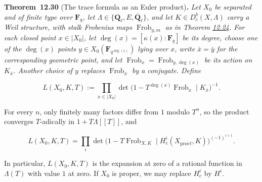 \documentclass[11pt]{article}
\newenvironment{bpstatement}[2]{\par\addvspace{0.6\baselineskip}\noindent\textbf{#1}#2\textbf{.}\enspace\ignorespaces}
  {\par\addvspace{0.4\baselineskip}}
\newenvironment{bpstatementit}[2]{\begin{bpstatement}{#1}{#2}\itshape\ignorespaces}{\end{bpstatement}}
\providecommand{\Dbc}{}\renewcommand{\Dbc}{D^b_c}
\begin{document}
\label{bp92}%
\begin{bpstatementit}{Theorem~12.30}{ (The trace formula as an Euler product)}
Let \(X_0\) be separated and of finite type over \(\mathbf F_q\), let \(\Lambda\in\{\mathbf Q_\ell,E,\overline{\mathbf Q}_\ell\}\), and let \(K\in\Dbc(X,\Lambda)\) carry a Weil structure, with stalk Frobenius maps \(\operatorname{Frob}_{y,m}\) as in Theorem \hyperref[bp73]{12.24}. For each closed point \(x\in|X_0|\), let \(\deg(x)=[\kappa(x):\mathbf F_q]\) be its degree, choose one of the \(\deg(x)\) points \(y\in X_0(\mathbf F_{q^{\deg(x)}})\) lying over \(x\), write \(\bar x=\bar y\) for the corresponding geometric point, and let \(\operatorname{Frob}_x=\operatorname{Frob}_{y,\deg(x)}\) be its action on \(K_{\bar x}\). Another choice of \(y\) replaces \(\operatorname{Frob}_x\) by a conjugate. Define

\[
L(X_0,K,T)
:=\prod_{x\in|X_0|}
\det\bigl(1-T^{\deg(x)}\operatorname{Frob}_x\mid K_{\bar x}\bigr)^{-1}.
\tag{12.6}
\]

For every \(n\), only finitely many factors differ from \(1\) modulo \(T^n\), so the product converges \(T\)-adically in \(1+T\Lambda[[T]]\), and

\[
L(X_0,K,T)
=\prod_i\det\bigl(1-T\operatorname{Frob}_{X,K}\mid H_c^i(X_{\mathrm{pro}\acute{e}t},K)\bigr)^{(-1)^{i+1}}.
\tag{12.7}
\]

In particular, \(L(X_0,K,T)\) is the expansion at zero of a rational function in \(\Lambda(T)\) with value \(1\) at zero. If \(X_0\) is proper, we may replace \(H_c^i\) by \(H^i\).
\end{bpstatementit}
\end{document}
